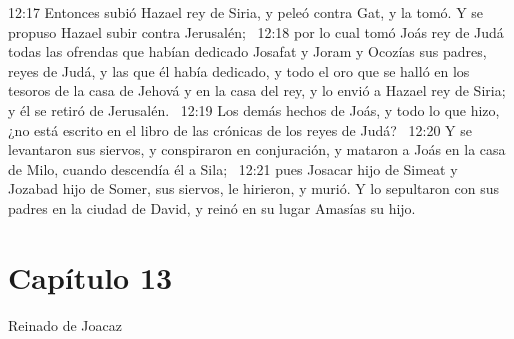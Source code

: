 12:17 Entonces subió Hazael rey de Siria, y peleó contra Gat, y la tomó. Y se propuso Hazael subir contra Jerusalén;  
12:18 por lo cual tomó Joás rey de Judá todas las ofrendas que habían dedicado Josafat y Joram y Ocozías sus padres, reyes de Judá, y las que él había dedicado, y todo el oro que se halló en los tesoros de la casa de Jehová y en la casa del rey, y lo envió a Hazael rey de Siria; y él se retiró de Jerusalén.  
12:19 Los demás hechos de Joás, y todo lo que hizo, ¿no está escrito en el libro de las crónicas de los reyes de Judá?  
12:20 Y se levantaron sus siervos, y conspiraron en conjuración, y mataron a Joás en la casa de Milo, cuando descendía él a Sila;  
12:21 pues Josacar hijo de Simeat y Jozabad hijo de Somer, sus siervos, le hirieron, y murió. Y lo sepultaron con sus padres en la ciudad de David, y reinó en su lugar Amasías su hijo.  
\section*{Capítulo 13 }
Reinado de Joacaz  

